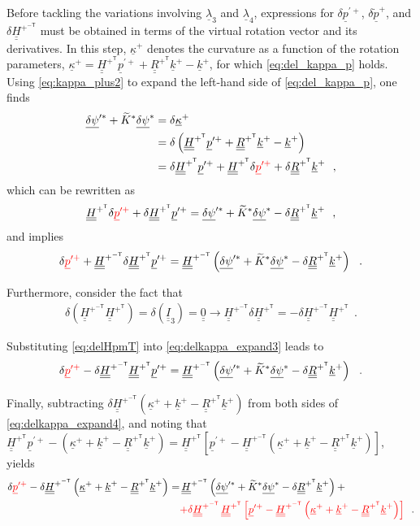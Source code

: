 \documentclass[12pt,a4paper,oneside,english]{abntex2} %
\newcommand{\fix}[1]{{\color{red}#1}}
\newcommand{\vect}[1]{\underline{#1}}
\def\tens#1{\underline{\underline{#1}}}
\def\til#1{\widetilde{#1}}
\def\lb{\left[}
\def\rb{\right]}
\def\lp{\left(}
\def\rp{\right)}
\def\T{\mathsf{T}}
\def\Ithree{\tens{I}_3}
\def\R{\tens{R}}
\def\RpT{\R^{+^\T}}
\def\kap{\vect{\kappa}}
\def\kapp{\kap^{+}}
\def\k{\vect{k}}
\def\kp{\k^{+}}
\def\Ktil{\til{K}}
\def\Ktils{\Ktil^{*}}
\def\H{\tens{H}}
\def\HpT{\H^{+^\T}}
\def\HpmT{\H^{+^{-\T}}}
\def\p{\vect{p}}
\def\pdot{\dot{\p}}
\def\ppdot{\pdot^{+}}
\def\ppprime{\p^{\prime{+}}}
\def\delpsi{\vect{\delta\psi}}
\def\delpsis{\delpsi^*}
\def\delpsips{\delpsi^{\prime*}}
\def\lamb{\vect{\lambda}}
\begin{document}
\begin{apendicesenv}
Before tackling the variations involving $\lamb_3$ and $\lamb_4$, expressions for $\delta\ppprime$, $\delta\ppdot$, and $\delta\HpmT$ must be obtained in terms of the virtual rotation vector and its derivatives. \fix{In this step, $\kapp$ denotes the curvature as a function of the rotation parameters, $\kapp=\HpT\ppprime+\RpT\kp-\kp$, for which \cref{eq:del_kappa_p} holds.} Using \cref{eq:kappa_plus2} to expand the left-hand side of \cref{eq:del_kappa_p}, one finds
\begin{align}
    \delpsips + \Ktils\delpsis &= \delta\kapp
    \nonumber 
    \\
    &= \delta\lp\HpT\ppprime + \RpT\kp - \kp\rp
    \nonumber 
    \\
    &= \delta\HpT\ppprime + \HpT\delta\fix{\ppprime} + \delta\RpT\kp \ \ ,
    \label{eq:delkappa_expand}
\end{align}
which can be rewritten as
\begin{align}
    \HpT\delta\fix{\ppprime} + \delta\HpT\ppprime = \delpsips + \Ktils\delpsis - \delta\RpT\kp \ \ ,
    \label{eq:delkappa_expand2}
\end{align}
and implies
\begin{align}
    \delta\fix{\ppprime} + \HpmT\delta\HpT\ppprime = \HpmT\lp\delpsips + \Ktils\delpsis - \delta\RpT\kp\rp \ \ .
    \label{eq:delkappa_expand3}
\end{align}

Furthermore, consider the fact that
\begin{align}
    \delta\lp\HpmT\HpT\rp = \delta\lp\Ithree\rp = \tens{0} \rightarrow \HpmT\delta\HpT = -\delta\HpmT\HpT \ \ .
    \label{eq:delHpmT}
\end{align}

Substituting \cref{eq:delHpmT} into \cref{eq:delkappa_expand3} leads to
\begin{align}
    \delta\fix{\ppprime} -\delta\HpmT\HpT\ppprime = \HpmT\lp\delpsips + \Ktils\delpsis - \delta\RpT\kp\rp \ \ .
    \label{eq:delkappa_expand4}
\end{align}

Finally, \fix{subtracting $\delta\HpmT\lp\kapp+\kp-\RpT\kp\rp$ from both sides of \cref{eq:delkappa_expand4}, and noting that $\HpT\ppprime-\lp\kapp+\kp-\RpT\kp\rp=\HpT\lb\ppprime-\HpmT\lp\kapp+\kp-\RpT\kp\rp\rb$,} yields
\begin{align}
    \delta\fix{\ppprime} -\delta\HpmT\lp\kapp+\kp-\RpT\kp\rp = & \, \HpmT\lp\delpsips + \Ktils\delpsis - \delta\RpT\kp\rp + \nonumber \\
    & \fix{+ \delta\HpmT\,\HpT\lb\ppprime-\HpmT\lp\kapp+\kp-\RpT\kp\rp\rb} \ \ .
    \label{eq:delpprime_expand}
\end{align}


\end{apendicesenv}
\end{document}
